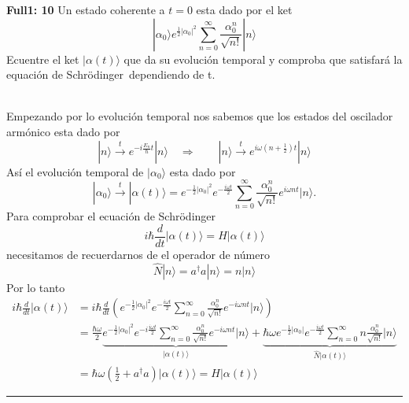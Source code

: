 	
\begin{ejercicio}
\textbf{Full1: 10} Un estado coherente a $t=0$ esta dado por el ket
$$
	| \alpha_0 \rangle e^{\frac{1}{2} |\alpha_0|^2} \sum_{n=0}^{\infty}
	\frac{\alpha_0^n}{\sqrt{n!}} |n\rangle 
$$
Ecuentre el ket $|\alpha(t)\rangle$ que da su evolución temporal y comproba que
satisfará la equación de Schrödinger dependiendo de t. \\\\
\end{ejercicio}
Empezando por lo evolución temporal nos sabemos que los estados del oscilador
armónico esta dado por
$$	
	|n\rangle \overset{t}{\longrightarrow} e^{-i\frac{E_n}{\hbar}t} |n\rangle
\quad \Rightarrow \qquad |n\rangle \overset{t}{\longrightarrow} e^{i\omega(n +
\frac{1}{2}) t} |n\rangle
$$
Así el evolución temporal de $|\alpha_0\rangle$ esta dado por
$$
	|\alpha_0\rangle \overset{t}{\longrightarrow} |\alpha(t) \rangle =
e^{-\frac{1}{2} |\alpha_0|^2} e^{-\frac{i\omega t}{2}} \sum_{n=0}^{\infty}
\frac{\alpha_0^n}{\sqrt{n!}} e^{i\omega n t} |n\rangle.
$$
Para comprobar el ecuación de Schrödinger
$$
	i \hbar \frac{d}{dt} |\alpha(t) \rangle = H | \alpha(t) \rangle
$$
necesitamos de recuerdarnos de el operador de número
$$
	\hat N | n \rangle = a^\dagger a | n\rangle = n | n \rangle
$$ 
Por lo tanto 
\begin{align*}
	i \hbar \frac{d}{dt} |\alpha(t) \rangle &= i \hbar
\frac{d}{dt} \left(e^{-\frac{1}{2} |\alpha_0|^2} e^{-\frac{i \omega t}{2}} \sum_{n=0}^{\infty}
\frac{\alpha_0^n}{\sqrt{n!}} e^{-i\omega n t} | n\rangle \right) \\
	&= \frac{\hbar \omega}{2} \underbrace{e^{-\frac{1}{2}|\alpha_0|^2}
e^{-i\frac{i \omega t}{2}} \sum_{n=0}^\infty \frac{\alpha_0^n}{\sqrt{n!}}
e^{-i\omega n t} | n\rangle}_{|\alpha(t)\rangle} + \underbrace{\hbar \omega
e^{-\frac{1}{2} |\alpha_0|} e^{-\frac{i\omega t}{2}} \sum_{n=0}^\infty n
\frac{\alpha_0^n}{\sqrt{n!}}|n\rangle}_{\hat N | \alpha(t) \rangle}  \\
	&= \hbar \omega \left(\frac{1}{2} + a^\dagger a \right) |\alpha(t)\rangle = H | \alpha(t) \rangle
\end{align*}
\rule{\textwidth}{1pt}


